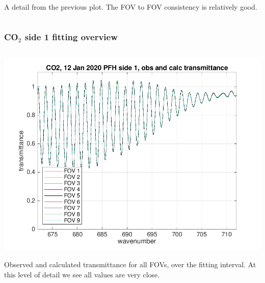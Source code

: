 \documentclass[10pt]{beamer}
\begin{document}
\begin{frame}
\begin{columns}[t]
\begin{column}{0.5\textwidth}
A detail from the previous plot.  The FOV to FOV consistency is
relatively good.

\end{column}
\end{columns}
\end{frame}
\begin{frame}
\frametitle{CO$_2$ side 1 fitting overview}
\begin{columns}[t]
\begin{column}{0.5\textwidth}  
  \begin{centering}
  \includegraphics[width=\textwidth]{01-12_pfh_s1_CO2/CO2_obs_and_calc.png}
  \end{centering}\vspace{3mm}

Observed and calculated transmittance for all FOVs, over the fitting
interval.  At this level of detail we see all values are very close.

\end{column}


\end{columns}
\end{frame}
\end{document}
